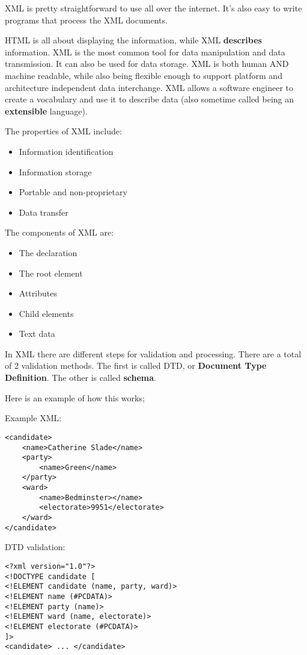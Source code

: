 \documentclass[11pt,a4paper,titlepage,dvipsnames,cmyk]{scrartcl}
\begin{document}
XML is pretty straightforward to use all over the internet. It's also easy
to write programs that process the XML documents.

HTML is all about displaying the information, while XML \textbf{describes}
information. XML is the most common tool for data manipulation and data
transmission. It can also be used for data storage. XML is both human AND
machine readable, while also being flexible enough to support platform and
architecture independent data interchange. XML allows a software engineer
to create a vocabulary and use it to describe data (also sometime called
being an \textbf{extensible} language).

The properties of XML include:
\begin{itemize}
    \item Information identification
    \item Information storage
    \item Portable and non-proprietary
    \item Data transfer
\end{itemize}

The components of XML are:

\begin{itemize}
    \item The declaration
    \item The root element
    \item Attributes
    \item Child elements
    \item Text data
\end{itemize}

In XML there are different steps for validation and processing. There are
a total of 2 validation methods. The first is called DTD, or
\textbf{Document Type Definition}. The other is called \textbf{schema}.

Here is an example of how this works;

Example XML:
\begin{lstlisting}[style=B]
<candidate>
    <name>Catherine Slade</name>
    <party>
        <name>Green</name>
    </party>
    <ward>
        <name>Bedminster></name>
        <electorate>9951</electorate>
    </ward>
</candidate>
\end{lstlisting}

DTD validation:
\begin{lstlisting}[style=B]
<?xml version="1.0"?>
<!DOCTYPE candidate [
<!ELEMENT candidate (name, party, ward)>
<!ELEMENT name (#PCDATA)>
<!ELEMENT party (name)>
<!ELEMENT ward (name, electorate)>
<!ELEMENT electorate (#PCDATA)>
]>
<candidate> ... </candidate>
\end{lstlisting}
\end{document}
